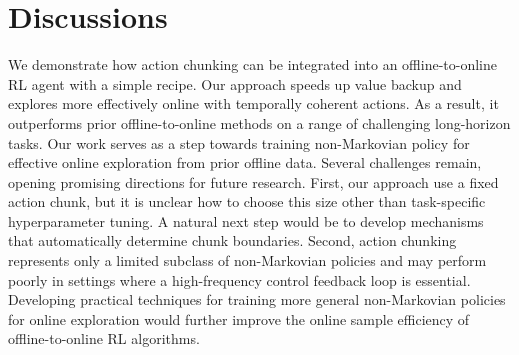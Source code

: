 \section{Discussions}
\label{sec:discussions}
We demonstrate how action chunking can be integrated into an offline-to-online RL agent with a simple recipe. Our approach speeds up value backup and explores more effectively online with temporally coherent actions. As a result, it outperforms prior offline-to-online methods on a range of challenging long-horizon tasks. Our work serves as a step towards training non-Markovian policy for effective online exploration from prior offline data. Several challenges remain, opening promising directions for future research. First, our approach use a fixed action chunk, but it is unclear how to choose this size other than task-specific hyperparameter tuning. A natural next step would be to develop mechanisms that automatically determine chunk boundaries. Second, action chunking represents only a limited subclass of non-Markovian policies and may perform poorly in settings where a high-frequency control feedback loop is essential. Developing practical techniques for training more general non-Markovian policies for online exploration would further improve the online sample efficiency of offline-to-online RL algorithms. 



